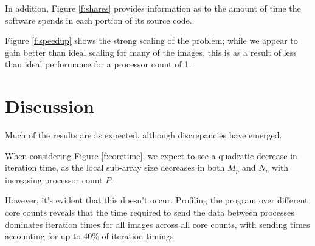 \documentclass{article} %
\begin{document}
In addition, Figure \ref{f:shares} provides information as to the amount of time the software spends in each portion of its source code.

Figure \ref{f:speedup} shows the strong scaling of the problem; while we appear to gain better than ideal scaling for many of the images, this is as a result of less than ideal performance for a processor count of 1.


\section*{Discussion}

Much of the results are as expected, although discrepancies have emerged.

When considering Figure \ref{f:coretime}, we expect to see a quadratic decrease in iteration time, as the local sub-array size decreases in both $M_p$ and $N_p$ with increasing processor count $P$.

However, it's evident that this doesn't occur.
Profiling the program over different core counts reveals that the time required to send the data between processes dominates iteration times for all images across all core counts, with sending times accounting for up to 40\% of iteration timings.
\end{document}
